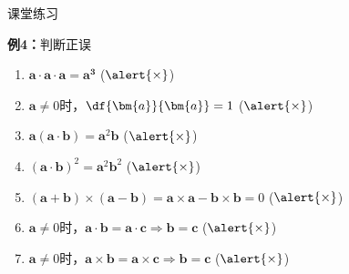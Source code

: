 \begin{frame}{课堂练习}
	\linespread{1.2}
	\begin{exampleblock}{{\bf 例4：}判断正误\hfill}
		\begin{enumerate}
		  \item $\bm{a}\cdot\bm{a}\cdot\bm{a}=\bm{a^3}$
		  \quad\pause(\;$\alert{\times}$\;)\pause
		  \item $\bm{a}\ne 0$时，$\df{\bm{a}}{\bm{a}}=1$
		  \quad\pause(\;$\alert{\times}$\;)\pause
		  \item $\bm{a}(\bm{a}\cdot\bm{b})=\bm{a}^2\bm{b}$
		  \quad\pause(\;$\alert{\times}$\;)\pause
		  \item $(\bm{a}\cdot\bm{b})^2=\bm{a}^2\bm{b}^2$
		  \quad\pause(\;$\alert{\times}$\;)\pause
		  \item $(\bm{a}+\bm{b})\times(\bm{a}-\bm{b})=\bm{a}\times\bm{a}
		  -\bm{b}\times\bm{b}=0$
		  \quad\pause(\;$\alert{\times}$\;)\pause
		  \item $\bm{a}\ne
		  0$时，$\bm{a}\cdot\bm{b}=\bm{a}\cdot\bm{c}\Rightarrow\bm{b}=\bm{c}$
		  \quad\pause(\;$\alert{\times}$\;)\pause
		  \item $\bm{a}\ne
		  0$时，$\bm{a}\times\bm{b}=\bm{a}\times\bm{c}\Rightarrow\bm{b}=\bm{c}$
		  \quad\pause(\;$\alert{\times}$\;)
		\end{enumerate}
	\end{exampleblock}
\end{frame}

